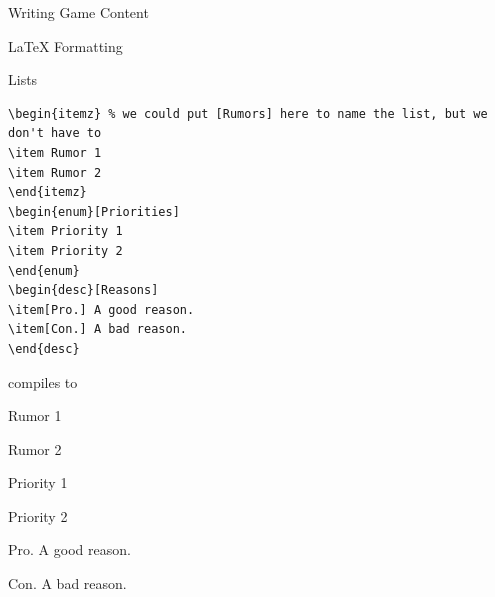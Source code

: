 \documentclass[sheet]{GameTexBase}
\begin{document}
\begin{section}{Writing Game Content}
\begin{subsection}{\LaTeX{} Formatting}
\begin{subsubsection}{\gametex{} Lists}
\begin{verbatim}
\begin{itemz} % we could put [Rumors] here to name the list, but we don't have to
\item Rumor 1
\item Rumor 2
\end{itemz}
\begin{enum}[Priorities]
\item Priority 1
\item Priority 2
\end{enum}
\begin{desc}[Reasons]
\item[Pro.] A good reason.
\item[Con.] A bad reason.
\end{desc}
\end{verbatim}
compiles to 
\begin{itemz} %
\item Rumor 1
\item Rumor 2
\end{itemz}
\begin{enum}[Priorities]
\item Priority 1
\item Priority 2
\end{enum}
\begin{desc}[Reasons]
\item[Pro.] A good reason.
\item[Con.] A bad reason.
\end{desc}
\end{subsubsection}
\end{subsection}
\end{section}
\end{document}
